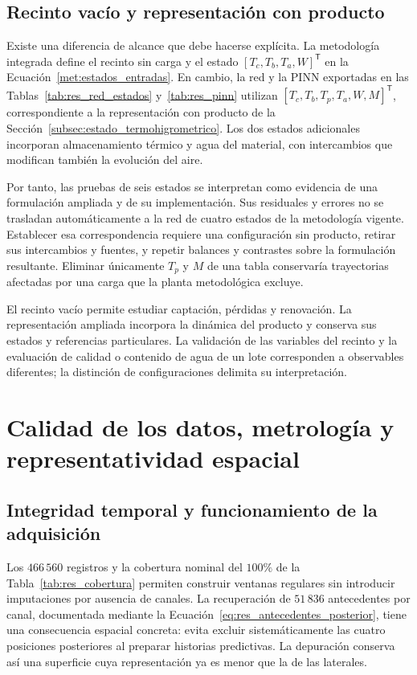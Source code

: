 \subsection{Recinto vacío y representación con producto}

Existe una diferencia de alcance que debe hacerse explícita. La metodología integrada define el recinto sin carga y el estado $[T_c,T_b,T_a,W]^{\mathsf T}$ en la Ecuación~\eqref{met:estados_entradas}. En cambio, la red y la PINN exportadas en las Tablas~\ref{tab:res_red_estados} y~\ref{tab:res_pinn} utilizan $[T_c,T_b,T_p,T_a,W,M]^{\mathsf T}$, correspondiente a la representación con producto de la Sección~\ref{subsec:estado_termohigrometrico}. Los dos estados adicionales incorporan almacenamiento térmico y agua del material, con intercambios que modifican también la evolución del aire.

Por tanto, las pruebas de seis estados se interpretan como evidencia de una formulación ampliada y de su implementación. Sus residuales y errores no se trasladan automáticamente a la red de cuatro estados de la metodología vigente. Establecer esa correspondencia requiere una configuración sin producto, retirar sus intercambios y fuentes, y repetir balances y contrastes sobre la formulación resultante. Eliminar únicamente $T_p$ y $M$ de una tabla conservaría trayectorias afectadas por una carga que la planta metodológica excluye.

El recinto vacío permite estudiar captación, pérdidas y renovación. La representación ampliada incorpora la dinámica del producto y conserva sus estados y referencias particulares. La validación de las variables del recinto y la evaluación de calidad o contenido de agua de un lote corresponden a observables diferentes; la distinción de configuraciones delimita su interpretación.
\FloatBarrier

\section{Calidad de los datos, metrología y representatividad espacial}
\label{dis:observacion}

\subsection{Integridad temporal y funcionamiento de la adquisición}

Los $466\,560$ registros y la cobertura nominal del $100\%$ de la Tabla~\ref{tab:res_cobertura} permiten construir ventanas regulares sin introducir imputaciones por ausencia de canales. La recuperación de $51\,836$ antecedentes por canal, documentada mediante la Ecuación~\eqref{eq:res_antecedentes_posterior}, tiene una consecuencia espacial concreta: evita excluir sistemáticamente las cuatro posiciones posteriores al preparar historias predictivas. La depuración conserva así una superficie cuya representación ya es menor que la de las laterales.

